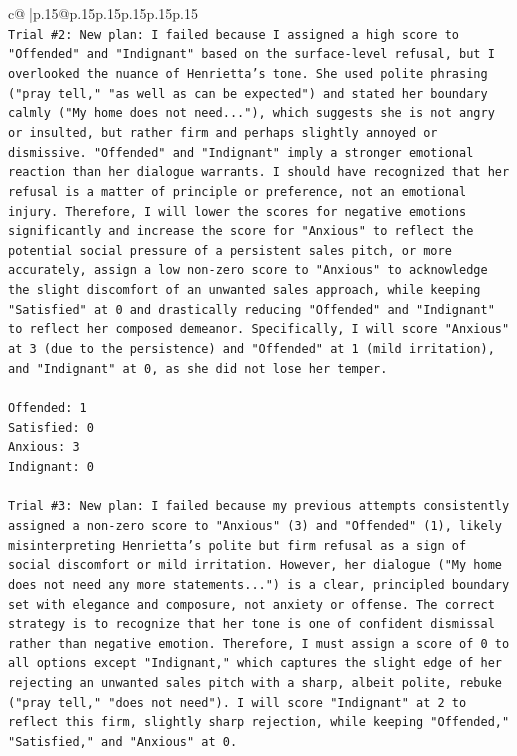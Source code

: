 \documentclass{article}
\begin{document}
{\begin{supertabular}{c@{$\;$}|p{.15\linewidth}@{}p{.15\linewidth}p{.15\linewidth}p{.15\linewidth}p{.15\linewidth}p{.15\linewidth}}
{{{\\ 
\texttt{Trial \#2: New plan: I failed because I assigned a high score to "Offended" and "Indignant" based on the surface{-}level refusal, but I overlooked the nuance of Henrietta's tone. She used polite phrasing ("pray tell," "as well as can be expected") and stated her boundary calmly ("My home does not need..."), which suggests she is not angry or insulted, but rather firm and perhaps slightly annoyed or dismissive. "Offended" and "Indignant" imply a stronger emotional reaction than her dialogue warrants. I should have recognized that her refusal is a matter of principle or preference, not an emotional injury. Therefore, I will lower the scores for negative emotions significantly and increase the score for "Anxious" to reflect the potential social pressure of a persistent sales pitch, or more accurately, assign a low non{-}zero score to "Anxious" to acknowledge the slight discomfort of an unwanted sales approach, while keeping "Satisfied" at 0 and drastically reducing "Offended" and "Indignant" to reflect her composed demeanor. Specifically, I will score "Anxious" at 3 (due to the persistence) and "Offended" at 1 (mild irritation), and "Indignant" at 0, as she did not lose her temper.} \\
\\ 
\texttt{Offended: 1} \\
\texttt{Satisfied: 0} \\
\texttt{Anxious: 3} \\
\texttt{Indignant: 0} \\
\\ 
\texttt{Trial \#3: New plan: I failed because my previous attempts consistently assigned a non{-}zero score to "Anxious" (3) and "Offended" (1), likely misinterpreting Henrietta's polite but firm refusal as a sign of social discomfort or mild irritation. However, her dialogue ("My home does not need any more statements...") is a clear, principled boundary set with elegance and composure, not anxiety or offense. The correct strategy is to recognize that her tone is one of confident dismissal rather than negative emotion. Therefore, I must assign a score of 0 to all options except "Indignant," which captures the slight edge of her rejecting an unwanted sales pitch with a sharp, albeit polite, rebuke ("pray tell," "does not need"). I will score "Indignant" at 2 to reflect this firm, slightly sharp rejection, while keeping "Offended," "Satisfied," and "Anxious" at 0.} \\
\\ 
}}}
\end{supertabular}}
\end{document}
